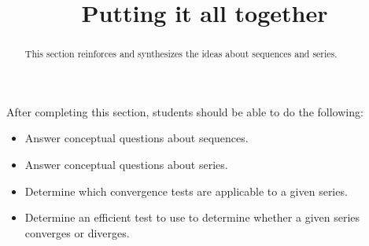 \documentclass{ximera}
\title{Putting it all together}
\begin{document}
\begin{abstract}
This section reinforces and synthesizes the ideas about sequences and series.
\end{abstract}

\maketitle

\begin{sectionOutcomes}

After completing this section, students should be able to do the following:

\begin{itemize}
\item Answer conceptual questions about sequences.
\item Answer conceptual questions about series.
\item Determine which convergence tests are applicable to a given series.
\item Determine an efficient test to use to determine whether a given series converges or diverges.
\end{itemize}

\end{sectionOutcomes}
\end{document}
